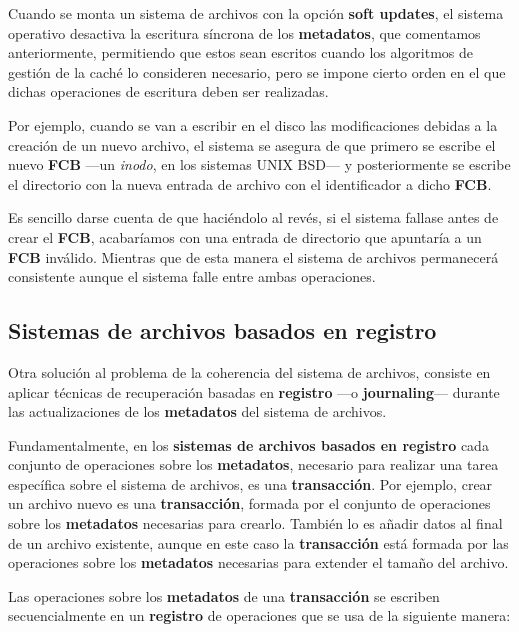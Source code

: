 Cuando se monta un sistema de archivos con la opción \textbf{soft
updates}, el sistema operativo desactiva la escritura síncrona de los
\textbf{metadatos}, que comentamos anteriormente, permitiendo que estos
sean escritos cuando los algoritmos de gestión de la caché lo consideren
necesario, pero se impone cierto orden en el que dichas operaciones de
escritura deben ser realizadas.

Por ejemplo, cuando se van a escribir en el disco las modificaciones
debidas a la creación de un nuevo archivo, el sistema se asegura de que
primero se escribe el nuevo \textbf{FCB} ---un \emph{inodo}, en los
sistemas UNIX BSD--- y posteriormente se escribe el directorio con la
nueva entrada de archivo con el identificador a dicho \textbf{FCB}.

Es sencillo darse cuenta de que haciéndolo al revés, si el sistema
fallase antes de crear el \textbf{FCB}, acabaríamos con una entrada de
directorio que apuntaría a un \textbf{FCB} inválido. Mientras que de
esta manera el sistema de archivos permanecerá consistente aunque el
sistema falle entre ambas operaciones.

\subsection{Sistemas de archivos basados en
registro}\label{_sistemas_de_archivos_basados_en_registro}

Otra solución al problema de la coherencia del sistema de archivos,
consiste en aplicar técnicas de recuperación basadas en
\textbf{registro} ---o \textbf{{}journaling}--- durante las
actualizaciones de los \textbf{metadatos} del sistema de archivos.

Fundamentalmente, en los \textbf{sistemas de archivos basados en
registro} cada conjunto de operaciones sobre los \textbf{metadatos},
necesario para realizar una tarea específica sobre el sistema de
archivos, es una \textbf{{}transacción}. Por ejemplo, crear un archivo
nuevo es una \textbf{transacción}, formada por el conjunto de
operaciones sobre los \textbf{metadatos} necesarias para crearlo.
También lo es añadir datos al final de un archivo existente, aunque en
este caso la \textbf{transacción} está formada por las operaciones sobre
los \textbf{metadatos} necesarias para extender el tamaño del archivo.

Las operaciones sobre los \textbf{metadatos} de una \textbf{transacción}
se escriben secuencialmente en un \textbf{registro} de operaciones que
se usa de la siguiente manera:

